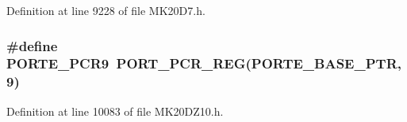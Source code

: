Definition at line 9228 of file M\+K20\+D7.\+h.

\subsubsection[{\texorpdfstring{P\+O\+R\+T\+E\+\_\+\+P\+C\+R9}{PORTE_PCR9}}]{\setlength{\rightskip}{0pt plus 5cm}\#define P\+O\+R\+T\+E\+\_\+\+P\+C\+R9~{\bf P\+O\+R\+T\+\_\+\+P\+C\+R\+\_\+\+R\+EG}({\bf P\+O\+R\+T\+E\+\_\+\+B\+A\+S\+E\+\_\+\+P\+TR},9)}\hypertarget{group___p_o_r_t___register___accessor___macros_gae47d538d3ecb0ef5372a27da8ac06b02}{}\label{group___p_o_r_t___register___accessor___macros_gae47d538d3ecb0ef5372a27da8ac06b02}


Definition at line 10083 of file M\+K20\+D\+Z10.\+h.

